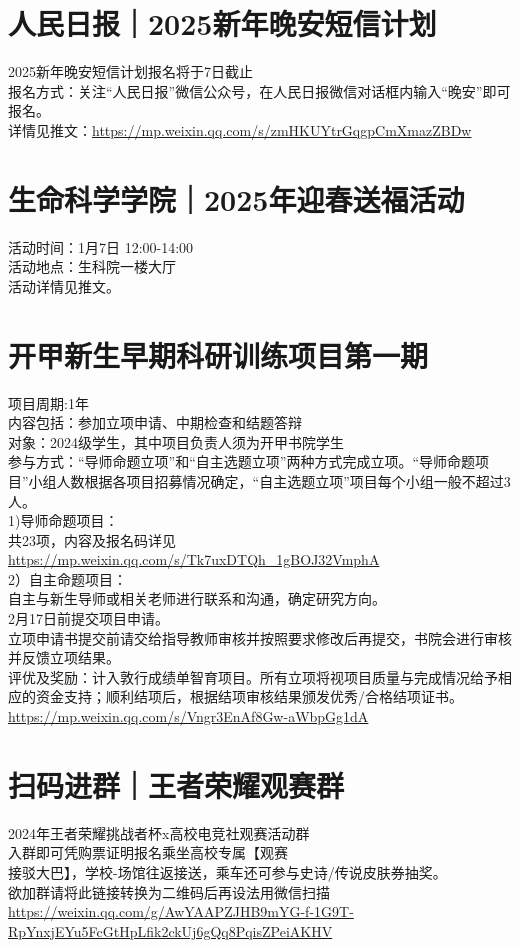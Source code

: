 \documentclass[letterpaper, 12pt]{article}
\begin{document}
\begin{multicols}{2}
\section{人民日报｜2025新年晚安短信计划}
2025新年晚安短信计划报名将于7日截止\\
报名方式：关注“人民日报”微信公众号，在人民日报微信对话框内输入“晚安”即可报名。\\
详情见推文：\url{https://mp.weixin.qq.com/s/zmHKUYtrGqgpCmXmazZBDw}
\section{生命科学学院｜2025年迎春送福活动}
活动时间：1月7日 12:00-14:00\\
活动地点：生科院一楼大厅\\
活动详情见推文。\\
\section{开甲新生早期科研训练项目第一期}
项目周期:1年\\
内容包括：参加立项申请、中期检查和结题答辩\\
对象：2024级学生，其中项目负责人须为开甲书院学生\\
参与方式：“导师命题立项”和“自主选题立项”两种方式完成立项。“导师命题项目”小组人数根据各项目招募情况确定，“自主选题立项”项目每个小组一般不超过3人。\\
1)导师命题项目：\\
共23项，内容及报名码详见\url{https://mp.weixin.qq.com/s/Tk7uxDTQh_1gBOJ32VmphA}\\
2）自主命题项目：\\
自主与新生导师或相关老师进行联系和沟通，确定研究方向。\\
2月17日前提交项目申请。\\
立项申请书提交前请交给指导教师审核并按照要求修改后再提交，书院会进行审核并反馈立项结果。\\
评优及奖励：计入敦行成绩单智育项目。所有立项将视项目质量与完成情况给予相应的资金支持；顺利结项后，根据结项审核结果颁发优秀/合格结项证书。\\
\url{https://mp.weixin.qq.com/s/Vngr3EnAf8Gw-aWbpGg1dA}
\section{扫码进群｜王者荣耀观赛群}
2024年王者荣耀挑战者杯x高校电竞社观赛活动群\\
入群即可凭购票证明报名乘坐高校专属【观赛\\
接驳大巴】，学校-场馆往返接送，乘车还可参与史诗/传说皮肤券抽奖。\\
欲加群请将此链接转换为二维码后再设法用微信扫描\url{https://weixin.qq.com/g/AwYAAPZJHB9mYG-f-1G9T-RpYnxjEYu5FcGtHpLfik2ckUj6gQq8PqisZPeiAKHV}

\end{multicols} 
\end{document}
